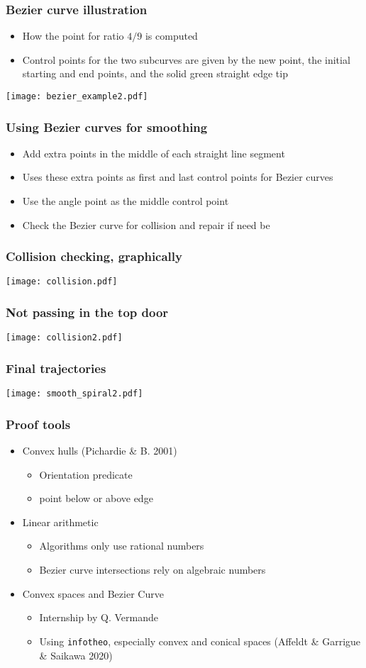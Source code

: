\documentclass[compress]{beamer}
\begin{document}
\begin{frame}
\frametitle{Bezier curve illustration}
\begin{itemize}
\item How the point for ratio \(4/9\) is computed
\item Control points for the two subcurves are given by the new point,
the initial starting and end points, and the solid green straight edge tip
\end{itemize}
\texttt{[image: bezier\_example2.pdf]}
\end{frame}
\begin{frame}
\frametitle{Using Bezier curves for smoothing}
\begin{itemize}
\item Add extra points in the middle of each straight line segment
\item Uses these extra points as first and last control points for Bezier curves
\item Use the angle point as the middle control point
\item Check the Bezier curve for collision and repair if need be
\end{itemize}
\end{frame}
\begin{frame}
\frametitle{Collision checking, graphically}
\texttt{[image: collision.pdf]}
\end{frame}
\begin{frame}
\frametitle{Not passing in the top door}
\texttt{[image: collision2.pdf]}
\end{frame}
\begin{frame}
\frametitle{Final trajectories}
\label{final-spiral}
\texttt{[image: smooth\_spiral2.pdf]}
\end{frame}
\begin{frame}
\frametitle{Proof tools}
\begin{itemize}
\item Convex hulls (Pichardie \& B. 2001)
\begin{itemize}
\item Orientation predicate
\item point below or above edge
\end{itemize}
\item Linear arithmetic
\begin{itemize}
\item Algorithms only use rational numbers
\item Bezier curve intersections rely on algebraic numbers
\end{itemize}
\item Convex spaces and Bezier Curve
\begin{itemize}
\item Internship by Q. Vermande
\item Using {\tt infotheo}, especially convex and conical spaces
         (Affeldt \& Garrigue \& Saikawa 2020)
\end{itemize}
\end{itemize}
\end{frame}
\end{document}
